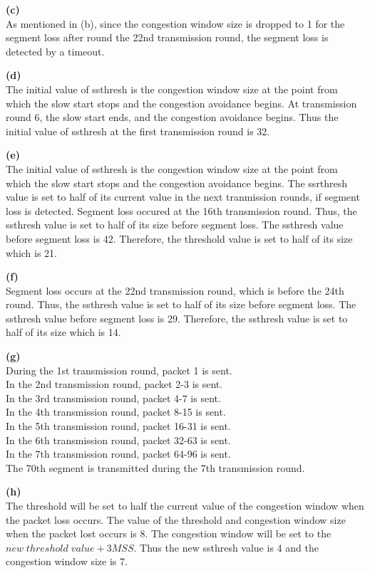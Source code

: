 \documentclass{article}
\begin{document}
\bigskip
{\bf (c)}\\
As mentioned in (b), since the congestion window size is dropped to 1 for the segment loss after round the 22nd transmission round, the segment loss is detected by a timeout.

\bigskip
{\bf (d)}\\
The initial value of ssthresh is the congestion window size at the point from which the slow start stops and the congestion avoidance begins. At transmission round 6, the slow start ends, and the congestion avoidance begins. Thus the initial value of ssthresh at the first transmission round is 32.

\bigskip
{\bf (e)}\\
The initial value of ssthresh is the congestion window size at the point from which the slow start stops and the congestion avoidance begins. The ssrthresh value is set to half of its current value in the next tranmission rounds, if segment loss is detected. Segment loss occured at the 16th transmission round. Thus, the ssthresh value is set to half of its size before segment loss. The ssthresh value before segment loss is 42. Therefore, the threshold value is set to half of its size which is 21.

\bigskip
{\bf (f)}\\
Segment loss occurs at the 22nd transmission round, which is before the 24th round. Thus, the ssthresh value is set to half of its size before segment loss. The ssthresh value before segment loss is 29. Therefore, the ssthresh value is set to half of its size which is 14.

\bigskip
{\bf (g)}\\
During the 1st transmission round, packet 1 is sent.\\ 
In the 2nd transmission round, packet 2-3 is sent.\\
In the 3rd transmission round, packet 4-7 is sent.\\
In the 4th transmission round, packet 8-15 is sent.\\
In the 5th transmission round, packet 16-31 is sent.\\
In the 6th transmission round, packet 32-63 is sent.\\
In the 7th transmission round, packet 64-96 is sent.\\
The 70th segment is transmitted during the 7th transmission round.

\bigskip
{\bf (h)}\\
The threshold will be set to half the current value of the congestion window when the packet loss occurs. The value of the threshold and congestion window size when the packet lost occurs is 8. The congestion window will be set to the $new \; threshold \; value + 3MSS$. Thus the new ssthresh value is 4 and the congestion window size is 7.
\end{document}
